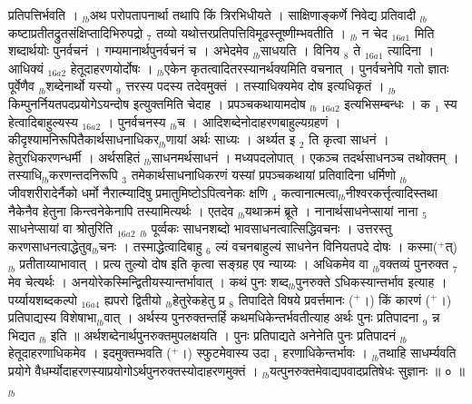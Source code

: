 \documentclass[article,12pt,a4paper]{memoir}%
\newcommand{\add}[1]{($^{+}$#1)}
\newcounter{parCount}
\begin{document}
प्रतिपत्तिर्भवति । {\tiny $_{lb}$}अथ परोपतापनार्था तथापि किं त्रिरभिधीयते । साक्षिणाङ्कर्णे निवेद्य प्रतिवादी {\tiny $_{lb}$}कष्टाप्रतीतद्रुतसंक्षिप्तादिभिरुपद्रो {\tiny $_{7}$} तव्यो यथोत्तरप्रतिपत्तिविमूढस्तूष्णीम्भवतीति । {\tiny $_{lb}$} {\color{DodgerBlue3}न चेद} {\tiny $_{16a1}$} मिति शब्दार्थयोः पुनर्वचनं । गम्यमानार्थपुनर्वचनं च । अभेदमेव {\tiny $_{lb}$}साधयति । {\color{DodgerBlue3}विनिय {\tiny $_{8}$} ते} {\tiny $_{16a1}$} त्यादिना । {\color{DodgerBlue3}आधिक्यं} {\tiny $_{16a2}$} हेतूदाहरणयोर्दोषः । {\tiny $_{lb}$}एकेन कृतत्वादितरस्यानर्थक्यमिति वचनात् । पुनर्वचनेपि गतो ज्ञातः पूर्वेणैव {\tiny $_{lb}$}शब्देनार्थो यस्यो {\tiny $_{9}$} \leavevmode{} त्तरस्य पदस्य तदेवमुक्तं ।  तस्याधिक्यमेव दोष इत्यधिकृतं । {\tiny $_{lb}$}किम्पुनर्नियतपदप्रयोगेऽयन्दोष इत्युक्तमिति चेदाह । {\color{DodgerBlue3}प्रपञ्चकथायामदोष} {\tiny $_{lb}$} {\tiny $_{16a2}$} इत्यभिसम्बन्धः । क {\tiny $_{1}$} स्य {\color{DodgerBlue3}हेत्वादिबाहुल्यस्य} {\tiny $_{16a2}$} । पुनर्वचनस्य {\tiny $_{lb}$}च । आदिशब्देनोदाहरणबाहुल्यग्रहणं । कीदृश्यामनिरूपितैकार्थसाधनाधिकर{\tiny $_{lb}$}णायां अर्थः साध्यः । अर्थ्यत इ {\tiny $_{2}$} ति कृत्वा साधनं । हेतुरधिकरणन्धर्मी । अर्थसहितं {\tiny $_{lb}$}साधनमर्थसाधनं । मध्यपदलोपात् । एकञ्च तदर्थसाधनञ्च तथोक्तम् । तस्याधि{\tiny $_{lb}$}करणन्तदनिरूपि {\tiny $_{3}$} तमेकार्थसाधनाधिकरणं यस्यां प्रपञ्चकथायां प्रतिवादिना धर्मिणो {\tiny $_{lb}$}जीवशरीरादेर्नैको धर्मो नैरात्म्यादिषु प्रमातुमिष्टोऽपित्वनेकः क्षणि {\tiny $_{4}$} कत्वानात्मत्वा{\tiny $_{lb}$}नीश्वरकर्त्तृत्वादिस्तथा नैकेनैव हेतुना किन्त्वनेकेनापि तस्यामित्यर्थः । एतदेव {\tiny $_{lb}$}यथाक्रमं ब्रूते । नानार्थसाधनेप्सायां {\color{DodgerBlue3}नाना {\tiny $_{5}$} साधनेप्सायां वा श्रोतुरिति} {\tiny $_{16a2}$} {\tiny $_{lb}$} पूर्व्वकः साधनशब्दो भावसाधनत्वात्सिद्धिवचनः । उत्तरस्तु करणसाधनत्वाद्धेतुव{\tiny $_{lb}$}चनः । तस्माद्धेत्वादिबाहु {\tiny $_{6}$} ल्यं वचनबाहुल्यं साधनेन विनियतपदे दोषः । कस्मा\add{त्} {\tiny $_{lb}$} \leavevmode{} प्रतीताय्याभावात् । प्रत्य तुल्यो दोष इति कृत्वा सङ्ग्रह एव न्याय्यः । अधिकमेव वा {\tiny $_{lb}$}वक्तव्यं पुनरुक्त {\tiny $_{7}$} मेव चेत्यर्थः । अनयोरेकस्मिन्द्वितीयस्यान्तर्भावात् । कथं पुनः शब्द{\tiny $_{lb}$}पुनरुक्ते ऽधिकस्यान्तर्भाव इत्याह । {\color{DodgerBlue3}पर्य्यायशब्दकल्पो} {\tiny $_{16a4}$} ह्यपरो द्वितीयो {\tiny $_{lb}$}हेतुरेकहेतु {\color{DodgerBlue3}प्र {\tiny $_{8}$} तिपादिते विषये प्रवर्त्तमानः} \add{।} किं कारणं \add{।} प्रतिपाद्यस्य विशेषाभा{\tiny $_{lb}$}वात् । अर्थस्य पुनरुक्तन्तर्हि कथमधिकेन्तर्भवतीत्याह {\color{DodgerBlue3}अर्थः पुनः प्रतिपादना {\tiny $_{9}$} \leavevmode{} न्न भिद्यत} {\tiny $_{lb}$} इति ॥ अर्थशब्देनार्थपुनरुक्तमुपलक्षयति । पुनः प्रतिपाद्यते अनेनेति पुनः प्रतिपादनं {\tiny $_{lb}$}हेतूदाहरणाधिकमेव । इदमुक्तम्भवति \add{।} स्फुटमेवास्य उदा {\tiny $_{1}$} हरणाधिकेन्तर्भावः । {\tiny $_{lb}$}तथाहि साधर्म्यवति प्रयोगे वैधर्म्योदाहरणस्याप्रयोगोऽर्थपुनरुक्तस्योदाहरणमुक्तं । {\tiny $_{lb}$}यत्पुनरुक्तमेवाद्यपवादप्रतिषेधः सुज्ञानः ॥ ० ॥ 
	{}
	\pend%
      {\tiny $_{lb}$}
\end{document}
